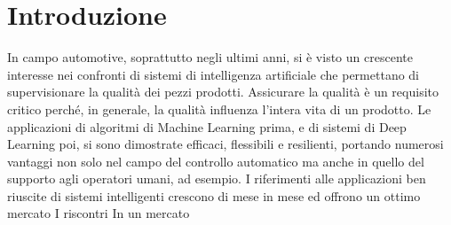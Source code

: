 
\chapter{Introduzione}

In campo automotive, soprattutto negli ultimi anni, si è visto un crescente interesse nei confronti di sistemi di intelligenza artificiale che permettano di supervisionare la qualità dei pezzi prodotti.
Assicurare la qualità è un requisito critico perché, in generale, la qualità influenza l'intera vita di un prodotto.
Le applicazioni di algoritmi di Machine Learning prima, e di sistemi di Deep Learning poi, si sono dimostrate efficaci, flessibili e resilienti, portando numerosi vantaggi non solo nel campo del controllo automatico ma anche in quello del supporto agli operatori umani, ad esempio.
I riferimenti alle applicazioni ben riuscite di sistemi intelligenti crescono di mese in mese ed offrono un ottimo mercato
I riscontri 
In un mercato 





